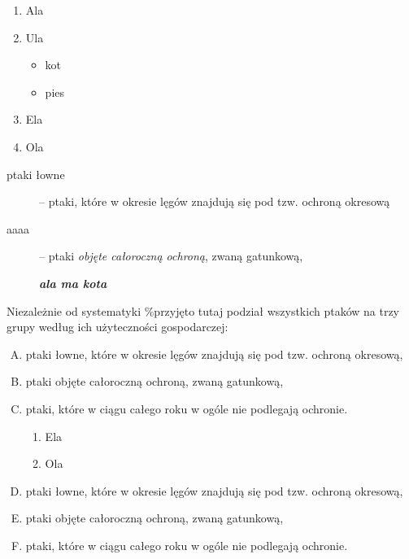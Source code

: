 \documentclass[a4paper,11pt]{article}
\begin{document}
\begin{enumerate}
\item Ala

\item Ula

\begin{itemize}
\item kot
\item pies
\end{itemize}

\item Ela

\item Ola
\end{enumerate}


\begin{description}
\item[ptaki łowne] -- ptaki, które w okresie lęgów znajdują się pod tzw. ochroną okresową

\item[aaaa] -- ptaki \textit{objęte całoroczną ochroną}, zwaną gatunkową,

\textit{\textbf{ala ma kota}}


\end{description}

Niezależnie od systematyki \%przyjęto tutaj podział wszystkich ptaków na trzy grupy według ich użyteczności gospodarczej:

\begin{enumerate}[A.]
\item ptaki łowne, które w okresie lęgów znajdują się pod tzw. ochroną okresową,
\item ptaki objęte całoroczną ochroną, zwaną gatunkową,
\item ptaki, które w ciągu całego roku w ogóle nie podlegają ochronie.

\begin{enumerate}[{\theenumi}.a)]
\item Ela

\item Ola
\end{enumerate}


\item ptaki łowne, {\LARGE które w okresie} lęgów znajdują się pod tzw. ochroną okresową,
\item ptaki objęte całoroczną ochroną, zwaną gatunkową,
\item ptaki, które w ciągu całego roku w ogóle nie podlegają ochronie.
\end{enumerate}
   
\end{document}
